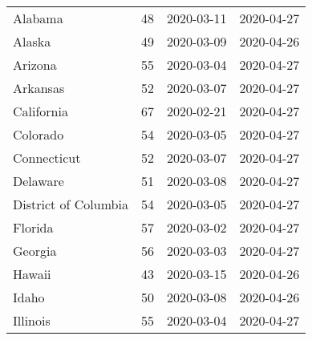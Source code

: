 \begin{longtable}{llll}
                    Alabama &  48 & 2020-03-11 & 2020-04-27 \\
                     Alaska &  49 & 2020-03-09 & 2020-04-26 \\
                    Arizona &  55 & 2020-03-04 & 2020-04-27 \\
                   Arkansas &  52 & 2020-03-07 & 2020-04-27 \\
                 California &  67 & 2020-02-21 & 2020-04-27 \\
                   Colorado &  54 & 2020-03-05 & 2020-04-27 \\
                Connecticut &  52 & 2020-03-07 & 2020-04-27 \\
                   Delaware &  51 & 2020-03-08 & 2020-04-27 \\
       District of Columbia &  54 & 2020-03-05 & 2020-04-27 \\
                    Florida &  57 & 2020-03-02 & 2020-04-27 \\
                    Georgia &  56 & 2020-03-03 & 2020-04-27 \\
                     Hawaii &  43 & 2020-03-15 & 2020-04-26 \\
                      Idaho &  50 & 2020-03-08 & 2020-04-26 \\
                   Illinois &  55 & 2020-03-04 & 2020-04-27 \\
\end{longtable}
